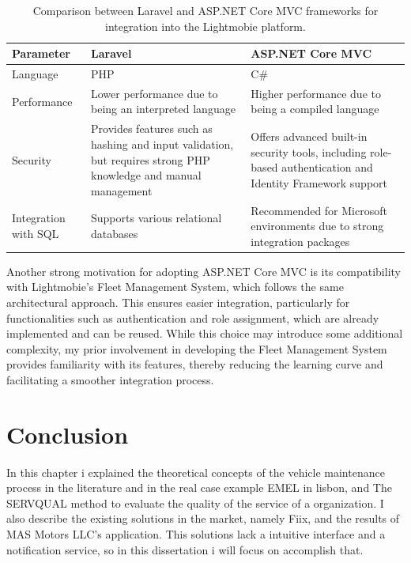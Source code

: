 \begin{table}[]
\begin{tabular}{| m{5em} | m{15em} | m{15em} |}
\hline
Parameter & Laravel & ASP.NET Core MVC \\
\hline
Language & PHP & C\# \\
\hline
Performance & Lower performance due to being an interpreted language & Higher performance due to being a compiled language \\
\hline 
Security & Provides features such as hashing and input validation, but requires strong PHP knowledge and manual management & Offers advanced built-in security tools, including role-based authentication and Identity Framework support \\
\hline
Integration with SQL & Supports various relational databases & Recommended for Microsoft environments due to strong integration packages \\
\hline
\end{tabular}
\caption{Comparison between Laravel and ASP.NET Core MVC frameworks for integration into the Lightmobie platform.}
\label{table:architetcture_comparison}
\end{table}
 
Another strong motivation for adopting ASP.NET Core MVC is its compatibility with Lightmobie's Fleet Management System, which follows the same architectural approach. This ensures easier integration, particularly for functionalities such as authentication and role assignment, which are already implemented and can be reused. While this choice may introduce some additional complexity, my prior involvement in developing the Fleet Management System provides familiarity with its features, thereby reducing the learning curve and facilitating a smoother integration process.
  

\section{Conclusion}

In this chapter i explained the theoretical concepts of the vehicle maintenance process in the literature and in the real case example EMEL in lisbon, and The SERVQUAL method to evaluate the quality of the service of a organization.
I also describe the existing solutions in the market, namely Fiix, and the results of MAS Motors LLC's application.
This solutions lack a intuitive interface and a notification service, so in this dissertation i will focus on accomplish that.

